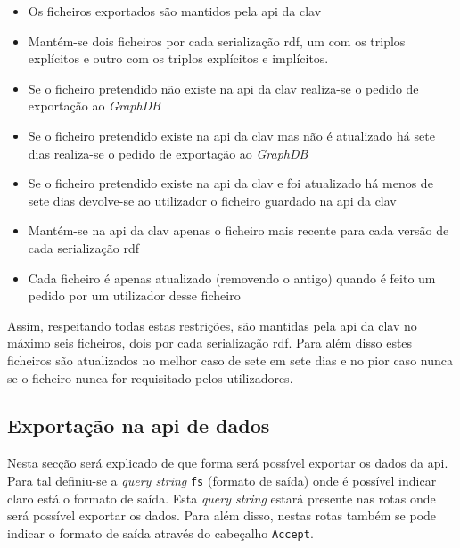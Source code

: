 \begin{itemize}
    \item Os ficheiros exportados são mantidos pela \acrshort{api} da \acrshort{clav}
    \item Mantém-se dois ficheiros por cada serialização \acrshort{rdf}, um com os triplos explícitos e outro com os triplos explícitos e implícitos.
    \item Se o ficheiro pretendido não existe na \acrshort{api} da \acrshort{clav} realiza-se o pedido de exportação ao \textit{GraphDB}
    \item Se o ficheiro pretendido existe na \acrshort{api} da \acrshort{clav} mas não é atualizado há sete dias realiza-se o pedido de exportação ao \textit{GraphDB}
    \item Se o ficheiro pretendido existe na \acrshort{api} da \acrshort{clav} e foi atualizado há menos de sete dias devolve-se ao utilizador o ficheiro guardado na \acrshort{api} da \acrshort{clav}
    \item Mantém-se na \acrshort{api} da \acrshort{clav} apenas o ficheiro mais recente para cada versão de cada serialização \acrshort{rdf}
    \item Cada ficheiro é apenas atualizado (removendo o antigo) quando é feito um pedido por um utilizador desse ficheiro
\end{itemize}

Assim, respeitando todas estas restrições, são mantidas pela \acrshort{api} da \acrshort{clav} no máximo seis ficheiros, dois por cada serialização \acrshort{rdf}. Para além disso estes ficheiros são atualizados no melhor caso de sete em sete dias e no pior caso nunca se o ficheiro nunca for requisitado pelos utilizadores.

\subsection{Exportação na \acrshort{api} de dados}
Nesta secção será explicado de que forma será possível exportar os dados da \acrshort{api}. Para tal definiu-se a \textit{query string} \texttt{fs} (formato de saída) onde é possível indicar claro está o formato de saída. Esta \textit{query string} estará presente nas rotas onde será possível exportar os dados. Para além disso, nestas rotas também se pode indicar o formato de saída através do cabeçalho \texttt{Accept}.

